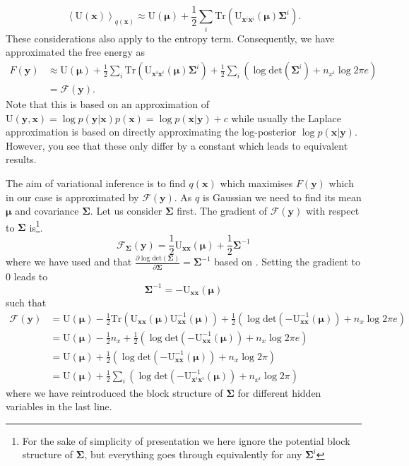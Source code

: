 \documentclass[a4paper,10pt]{article}
\newcommand{\bs}[1]{\mathbf{#1}}					%
\newcommand{\bgs}[1]{\boldsymbol{#1}}				%
\newcommand{\pd}[2]{\frac{\partial #1}{\partial #2}} 	%
\newcommand{\eq}[1]{\begin{equation} #1 \end{equation}}%
\newcommand{\trace}[1]{\mathrm{Tr}\left(#1\right)}					%
\newcommand{\so}{y}         %
\newcommand{\sh}{x}         %
\newcommand{\po}{\bs{\so}}    %
\newcommand{\ph}{\bs{\sh}}    %
\newcommand{\E}[2][]{\left\langle #2 \right\rangle_{#1}}	%
\newcommand{\U}{\mathrm{U}}			%
\newcommand{\F}{\mathcal{F}}				%
\newcommand{\Cov}{\bgs{\Sigma}}			%
\renewcommand{\det}[1]{\mathrm{det}(#1)}	%
\begin{document}
\eq{\label{eq:blockq}
    \E[q(\ph)]{\U(\ph)} \approx \U(\bgs{\mu}) + \frac{1}{2}\sum_i\trace{\U_{\ph^i\ph^i}(\bgs{\mu})\Cov^i}.
}
These considerations also apply to the entropy term. Consequently, we have approximated the free energy as
\eq{\begin{split}\label{eq:FapproxC}
    F(\po) &\approx \U(\bgs{\mu}) + \frac{1}{2}\sum_i\trace{\U_{\ph^i\ph^i}(\bgs{\mu})\Cov^i} + \frac{1}{2} \sum_i\left(\log \det{\Cov^i} + n_{\sh^i} \log 2\pi e\right)\\
    &= \F(\po).
\end{split}}
Note that this is based on an approximation of $\U(\po,\ph) = \log p(\po|\ph)p(\ph) = \log p(\ph|\po) + c$ while usually the Laplace approximation is based on directly approximating the  log-posterior $\log p(\ph|\po)$. However, you see that these only differ by a constant which leads to equivalent results.

The aim of variational inference is to find $q(\ph)$ which maximises $F(\po)$ which in our case is approximated by $\F(\po)$. As $q$ is Gaussian we need to find its mean $\bgs{\mu}$ and covariance $\Cov$. Let us consider $\Cov$ first. The gradient of $\F(\po)$ with respect to $\Cov$ is\footnote{For the sake of simplicity of presentation we here ignore the potential block structure of $\Cov$, but everything goes through equivalently for any $\Cov^i$}.
\eq{
    \F_{\Cov}(\po) = \frac{1}{2} \U_{\ph\ph}(\bgs{\mu}) + \frac{1}{2} \Cov^{-1}
}
where we have used \citep[][eq. (96)]{Petersen2008} and that $\pd{\log \det{\Cov}}{\Cov} = \Cov^{-1}$ based on \citep[][eq. (43)]{Petersen2008}. Setting the gradient to 0 leads to
\eq{\label{eq:covSol}
    \Cov^{-1} = -\U_{\ph\ph}(\bgs{\mu})
}
such that
\begin{align}
    \F(\po) &= \U(\bgs{\mu}) - \frac{1}{2}\trace{\U_{\ph\ph}(\bgs{\mu})\U_{\ph\ph}^{-1}(\bgs{\mu})} + \frac{1}{2} \left(\log \det{-\U_{\ph\ph}^{-1}(\bgs{\mu})} + n_\sh \log 2\pi e\right)\nonumber\\
    &= \U(\bgs{\mu}) - \frac{1}{2}n_\sh + \frac{1}{2} \left(\log \det{-\U_{\ph\ph}^{-1}(\bgs{\mu})} + n_\sh \log 2\pi e\right)\nonumber\\
    &= \U(\bgs{\mu}) + \frac{1}{2} \left(\log \det{-\U_{\ph\ph}^{-1}(\bgs{\mu})} + n_\sh \log 2\pi\right)\\
    &= \label{eq:approxFreeE}\U(\bgs{\mu}) + \frac{1}{2} \sum_i \left(\log \det{-\U_{\ph^i \ph^i}^{-1}(\bgs{\mu})} + n_{\sh^i} \log 2\pi\right)
\end{align}
where we have reintroduced the block structure of $\Cov$ for different hidden variables in the last line.
\end{document}
